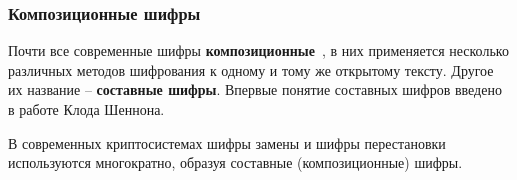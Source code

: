 \subsubsection{Композиционные шифры}

Почти все современные шифры \textbf{композиционные}~\cite{AlZKCh:2001}, в них применяется несколько различных методов шифрования к одному и тому же открытому тексту.  Другое их название -- \textbf{составные шифры}. Впервые понятие составных шифров введено в работе Клода Шеннона.

В современных криптосистемах шифры замены и шифры перестановки используются многократно, образуя составные (композиционные) шифры.

